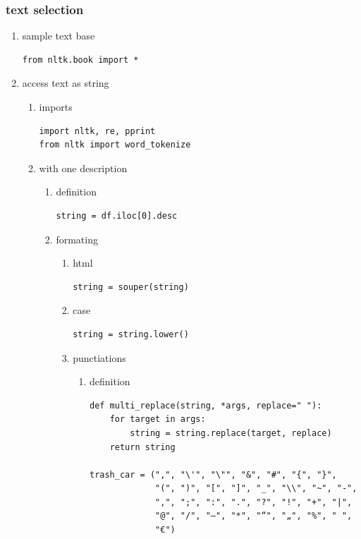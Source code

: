 \documentclass[11pt]{article}
\begin{document}
\subsubsection{text selection}
\label{sec:orgd64b8b0}
\begin{enumerate}
\item sample text base
\label{sec:org0fc5cca}
\begin{verbatim}
from nltk.book import *
\end{verbatim}
\item access text as string
\label{sec:org6cb34f2}
\begin{enumerate}
\item imports
\label{sec:orgd047991}
\begin{verbatim}
import nltk, re, pprint
from nltk import word_tokenize
\end{verbatim}
\item with one description
\label{sec:org6909a22}
\begin{enumerate}
\item definition
\label{sec:org6fdaac0}
\begin{verbatim}
string = df.iloc[0].desc
\end{verbatim}

\item formating
\label{sec:orgfa1ea08}
\begin{enumerate}
\item html
\label{sec:org4d90bb8}
\begin{verbatim}
string = souper(string)
\end{verbatim}

\item case
\label{sec:orgd5e9a49}
\begin{verbatim}
string = string.lower()
\end{verbatim}

\item punctiations
\label{sec:org7d92902}

\begin{enumerate}
\item definition
\label{sec:orgbc40670}
\begin{verbatim}
def multi_replace(string, *args, replace=" "):
    for target in args:
        string = string.replace(target, replace)
    return string

trash_car = (",", "\'", "\"", "&", "#", "{", "}",
             "(", ")", "[", "]", "_", "\\", "~", "-",
             ",", ";", ":", ".", "?", "!", "+", "|",
             "@", "/", "–", "*", "“", "„", "%", " ",
             "€")


\end{verbatim}
\end{enumerate}
\end{enumerate}
\end{enumerate}
\end{enumerate}
\end{enumerate}
\end{document}
